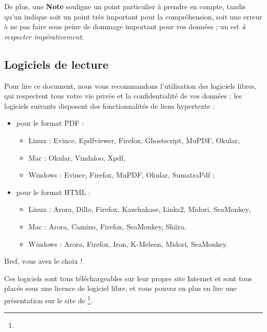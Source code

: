 De plus, une \textbf{Note} souligne un point particulier à prendre en compte, tandis qu'un  indique soit un point très important pour la compréhension, soit une erreur à ne pas faire sous peine de dommage important pour vos données ; un  est \emph{à respecter impérativement}.


\subsection{Logiciels de lecture\label{introduction-manual-readers}}

Pour lire ce document, nous vous recommandons l'utilisation des logiciels libres, qui respectent tous votre vie privée et la confidentialité de vos données ; les logiciels suivants disposent des fonctionnalités de \gls{liens hypertexte} : 
\begin{itemize}
	\item pour le format PDF : 
		\begin{itemize}
				\item Linux : Evince, Epdfviewer, Firefox, Ghostscript, MuPDF, Okular,
				\item Mac : Okular, Vindaloo, Xpdf,
				\item Windows : Evince, Firefox, MuPDF, Okular, SumatraPdf ;
		\end{itemize}
	\item pour le format HTML :
		\begin{itemize}
				\item Linux : Arora, Dillo, Firefox, Kazehakase, Links2, Midori, SeaMonkey,
				\item Mac : Arora, Camino, Firefox, SeaMonkey, Shiira,
				\item Windows : Arora, Firefox, Iron, K-Meleon, Midori, SeaMonkey.
		\end{itemize}
\end{itemize}

Bref, vous avez le choix !

Ces logiciels sont tous téléchargeables sur leur propre site Internet et sont tous placés sous une licence de \gls{logiciel libre}, et vous pouvez en plus en lire une présentation sur le site de \footnote{\urlFramasoftLogiciels{}}.
